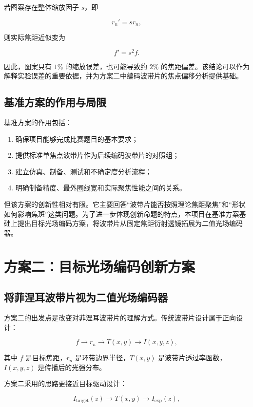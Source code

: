 \documentclass[UTF8,a4paper,11pt]{ctexart}
\begin{document}
若图案存在整体缩放因子 $s$，即

\[
r_n'=sr_n,
\]

则实际焦距近似变为

\[
f'=s^2f.
\]

因此，图案只有 $1\%$ 的缩放误差，也可能导致约 $2\%$ 的焦距偏差。该结论可以作为解释实验误差的重要依据，并为方案二中编码波带片的焦点偏移分析提供基础。

\subsection{基准方案的作用与局限}

基准方案的作用包括：

\begin{enumerate}[label=(\arabic*)]
\item 确保项目能够完成比赛题目的基本要求；
\item 提供标准单焦点波带片作为后续编码波带片的对照组；
\item 建立仿真、制备、测试和不确定度分析流程；
\item 明确制备精度、最外圈线宽和实际聚焦性能之间的关系。
\end{enumerate}

但该方案的创新性相对有限。它主要回答“波带片能否按照理论焦距聚焦”和“形状如何影响焦斑”这类问题。为了进一步体现创新命题的特点，本项目在基准方案基础上提出目标光场编码方案，将波带片从固定焦距衍射透镜拓展为二值光场编码器。

\section{方案二：目标光场编码创新方案}

\subsection{将菲涅耳波带片视为二值光场编码器}

方案二的出发点是改变对菲涅耳波带片的理解方式。传统波带片设计属于正向设计：

\[
f \longrightarrow r_n \longrightarrow T(x,y) \longrightarrow I(x,y,z),
\]

其中 $f$ 是目标焦距，$r_n$ 是环带边界半径，$T(x,y)$ 是波带片透过率函数，$I(x,y,z)$ 是传播后的光强分布。

方案二采用的思路更接近目标驱动设计：

\[
I_{\mathrm{target}}(z) \longrightarrow T(x,y) \longrightarrow I_{\mathrm{exp}}(z),
\]
\end{document}
